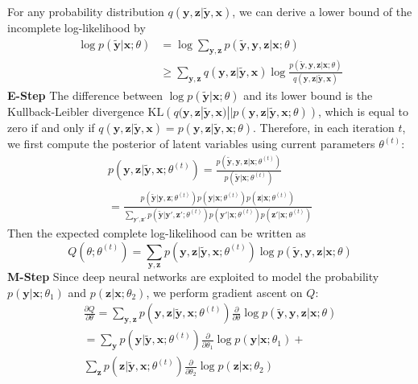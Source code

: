 \documentclass[10pt,twocolumn,letterpaper]{article}
\def\vec{\mathbf}
\begin{document}
For any probability distribution $q(\vec{y}, \vec{z} | \tilde{\vec{y}}, \vec{x})$, we can derive a lower bound of the incomplete log-likelihood by
\begin{equation}
\begin{aligned}
    \log p(\tilde{\vec{y}} | \vec{x}; \theta) &= \log \sum_{\vec{y},\vec{z}} p(\tilde{\vec{y}}, \vec{y}, \vec{z} | \vec{x}; \theta) \\
    &\geq \sum_{\vec{y},\vec{z}} q(\vec{y}, \vec{z} | \tilde{\vec{y}}, \vec{x}) \log \frac{p(\tilde{\vec{y}}, \vec{y}, \vec{z} | \vec{x}; \theta)}{q(\vec{y}, \vec{z} | \tilde{\vec{y}}, \vec{x})}
\end{aligned}
\end{equation}
\textbf{E-Step} The difference between $\log p(\tilde{\vec{y}} | \vec{x}; \theta)$ and its lower bound is the Kullback-Leibler divergence $\mathrm{KL}\left(q(\vec{y}, \vec{z} | \tilde{\vec{y}}, \vec{x}) || p(\vec{y}, \vec{z} | \tilde{\vec{y}}, \vec{x}; \theta)\right)$, which is equal to zero if and only if $q(\vec{y}, \vec{z} | \tilde{\vec{y}}, \vec{x}) = p(\vec{y}, \vec{z} | \tilde{\vec{y}}, \vec{x}; \theta)$. Therefore, in each iteration $t$, we first compute the posterior of latent variables using current parameters $\theta^{(t)}$:
\begin{multline} \label{eq:posterior}
    p(\vec{y}, \vec{z} | \tilde{\vec{y}}, \vec{x}; \theta^{(t)}) = \frac{p(\tilde{\vec{y}}, \vec{y}, \vec{z} | \vec{x}; \theta^{(t)})}{p(\tilde{\vec{y}} | \vec{x}; \theta^{(t)})} \\
    = \frac{p(\tilde{\vec{y}}|\vec{y},\vec{z};\theta^{(t)}) p(\vec{y}|\vec{x};\theta^{(t)}) p(\vec{z}|\vec{x};\theta^{(t)})}{\sum_{\vec{y}',\vec{z}'} p(\tilde{\vec{y}}|\vec{y}',\vec{z}';\theta^{(t)}) p(\vec{y}'|\vec{x};\theta^{(t)}) p(\vec{z}'|\vec{x};\theta^{(t)})}
\end{multline}
Then the expected complete log-likelihood can be written as
\begin{equation}
    Q(\theta; \theta^{(t)}) = \sum_{\vec{y},\vec{z}} p(\vec{y}, \vec{z} | \tilde{\vec{y}}, \vec{x}; \theta^{(t)}) \log p(\tilde{\vec{y}}, \vec{y}, \vec{z} | \vec{x}; \theta)
\end{equation}
\textbf{M-Step} Since deep neural networks are exploited to model the probability $p(\vec{y}|\vec{x};\theta_1)$ and $p(\vec{z}|\vec{x};\theta_2)$, we perform gradient ascent on $Q$:
\begin{multline} \label{eq:gradient}
    \frac{\partial Q}{\partial \theta} = \sum_{\vec{y},\vec{z}} p(\vec{y}, \vec{z} | \tilde{\vec{y}}, \vec{x}; \theta^{(t)}) \frac{\partial}{\partial \theta} \log p(\tilde{\vec{y}}, \vec{y}, \vec{z} | \vec{x}; \theta) \\
    = \sum_{\vec{y}} p(\vec{y} | \tilde{\vec{y}}, \vec{x}; \theta^{(t)}) \frac{\partial}{\partial \theta_1} \log p(\vec{y}|\vec{x};\theta_1) + \\
      \sum_{\vec{z}} p(\vec{z} | \tilde{\vec{y}}, \vec{x}; \theta^{(t)}) \frac{\partial}{\partial \theta_2} \log p(\vec{z}|\vec{x};\theta_2)
\end{multline}
\end{document}
